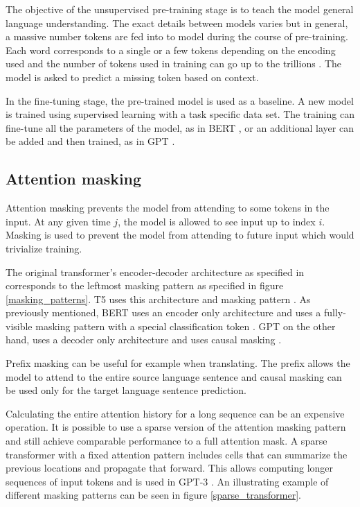 \documentclass[twoside]{article}
\begin{document}
The objective of the unsupervised pre-training stage is to teach the model
general language understanding. The exact details between models varies but
in general, a massive number tokens are fed into to model during the course
of pre-training. Each word corresponds to a single or a few tokens depending on 
the encoding used \cite{noauthor_pricing_nodate} and the number of tokens
used in training can go up to the trillions \cite{raffel_exploring_2020}. 
The model is asked to predict a missing token based on context. 

In the fine-tuning stage, the pre-trained model is used as a baseline. A new
model is trained using supervised learning with a task specific data set. 
The training can fine-tune all the parameters of the model, as in BERT 
\cite{devlin_bert_2019}, or an additional layer can be added and then
trained, as in GPT \cite{radford_improving_nodate}.

\subsection{Attention masking}
Attention masking prevents the model from attending to some tokens in the input. At any
given time $j$, the model is allowed to see input up to index $i$. Masking is used to prevent the model from
attending to future input which would trivialize training. \cite{raffel_exploring_2020}

The original transformer's encoder-decoder architecture as specified in 
\cite{vaswani_attention_2017} corresponds to the leftmost masking pattern as
specified in figure \ref{masking_patterns}. T5 uses this architecture and masking pattern
\cite{raffel_exploring_2020}. As previously mentioned, BERT uses an encoder
only architecture \cite{devlin_bert_2019} and uses a fully-visible masking 
pattern with a special classification token \cite{raffel_exploring_2020}. GPT on
the other hand, uses a decoder only architecture \cite{radford_improving_nodate}
and uses causal masking \cite{liu_generating_2018}.

Prefix masking can be useful for example when translating. The prefix allows the
model to attend to the entire source language sentence and causal masking can be 
used only for the target language sentence prediction. \cite{raffel_exploring_2020}

Calculating the entire attention history for a long sequence can be an expensive operation.
It is possible to use a sparse version of the attention masking pattern and still achieve 
comparable performance to a full attention mask. A sparse transformer with a fixed attention
pattern includes cells that can summarize the previous locations and propagate 
that forward. This allows computing longer sequences of input tokens and is used in GPT-3
\cite{brown_language_2020}. An illustrating example of different masking patterns
can be seen in figure \ref{sparse_transformer}. \cite{child_generating_2019}
\end{document}
